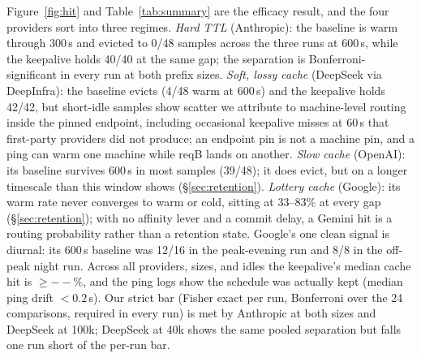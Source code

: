 \documentclass[10pt,twocolumn]{article}
\providecommand{\keepaliveMinHit}{--}\providecommand{\bestSavingRatio}{--}\providecommand{\bestSavingDesc}{--}%
\begin{document}
Figure~\ref{fig:hit} and Table~\ref{tab:summary} are the efficacy result, and
the four providers sort into three regimes. \emph{Hard TTL} (Anthropic): the
baseline is warm through 300\,s and evicted to 0/48 samples across the three
runs at 600\,s, while the keepalive holds 40/40 at the same gap; the separation
is Bonferroni-significant in every run at both prefix sizes. \emph{Soft, lossy
cache} (DeepSeek via DeepInfra): the baseline evicts (4/48 warm at 600\,s) and
the keepalive holds 42/42, but short-idle samples show scatter we attribute to
machine-level routing inside the pinned endpoint, including occasional
keepalive misses at 60\,s that first-party providers did not produce; an
endpoint pin is not a machine pin, and a ping can warm one machine while reqB
lands on another. \emph{Slow cache} (OpenAI): its baseline survives
600\,s in most samples (39/48); it does evict, but on a longer timescale than
this window shows (\S\ref{sec:retention}). \emph{Lottery cache} (Google): its warm rate never
converges to warm or cold, sitting at 33--83\% at every gap
(\S\ref{sec:retention}); with no affinity lever and a commit delay, a Gemini
hit is a routing probability rather than a retention state. Google's one clean
signal is diurnal: its 600\,s baseline was 12/16 in the peak-evening run and
8/8 in the off-peak night run. Across all providers, sizes, and idles the
keepalive's median cache hit is ${\geq}\keepaliveMinHit\%$, and the ping logs
show the schedule was actually kept (median ping drift ${<}0.2$\,s). Our strict
bar (Fisher exact per run, Bonferroni over the 24 comparisons, required in
every run) is met by Anthropic at both sizes and DeepSeek at 100k; DeepSeek at
40k shows the same pooled separation but falls one run short of the per-run bar.
\end{document}

